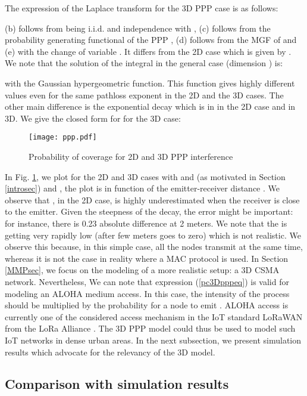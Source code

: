 \documentclass{sig-alternate-05-2015}
\begin{document}
The expression of the Laplace transform for the 3D PPP case is as follows:



(b) follows from  being i.i.d. and independence with , (c) follows from the probability generating functional of the PPP \cite{stoyan87}, (d) follows from the MGF of  and (e) with the change of variable . It differs from the 2D case which is given by . We note that the solution of the integral in the general case (dimension ) is:


with  the Gaussian hypergeometric function. This function gives highly different values even for the same pathloss exponent  in the 2D and the 3D cases. The other main difference is the exponential decay which is in  in the 2D case and  in 3D. We give the closed form for  for the 3D case:



\begin{figure}[ht]
  \centering
  \texttt{[image: ppp.pdf]}
  \caption{Probability of coverage for 2D and 3D PPP interference}
  \label{pppfig}
\end{figure}

In Fig. \ref{pppfig}, we plot  for the 2D and 3D cases with  and  (as motivated in Section \ref{introsec}) and , the plot is in function of the emitter-receiver distance . We observe that , in the 2D case, is highly underestimated when the receiver is close to the emitter. Given the steepness of the decay, the error might be important: for instance, there is 0.23 absolute difference at 2 meters. We note that the  is getting very rapidly low (after few meters  goes to zero) which is not realistic. We observe this because, in this simple case, all the nodes transmit at the same time, whereas it is not the case in reality where a MAC protocol is used. 
In Section \ref{MMPsec}, we focus on the modeling of a more realistic setup: a 3D CSMA network. Nevertheless, We can note that expression (\ref{pc3Dpppeq}) is valid for modeling an ALOHA medium access. In this case, the intensity of the process should be multiplied by the probability for a node to emit \cite{baccelli09}. ALOHA access is currently one of the considered access mechanism in the IoT standard LoRaWAN \cite{lorawan} from the LoRa Alliance \cite{loraaliance}. The 3D PPP model could thus be used to model such IoT networks in dense urban areas. In the next subsection, we present simulation results which advocate for the relevancy of the 3D model.


\subsection{Comparison with simulation results}
\label{pppsimsec}
\end{document}
